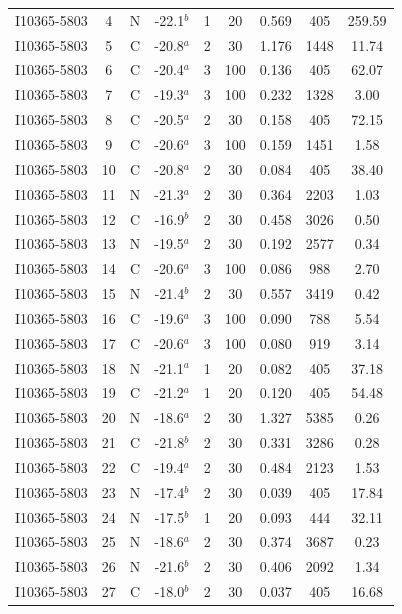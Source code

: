 \begin{table}
\begin{tabular}{ccccccccc}
I10365-5803 & 4 & N & -22.1$^{b}$ & 1 & 20 & 0.569 & 405 & 259.59 \\
I10365-5803 & 5 & C & -20.8$^{a}$ & 2 & 30 & 1.176 & 1448 & 11.74 \\
I10365-5803 & 6 & C & -20.4$^{a}$ & 3 & 100 & 0.136 & 405 & 62.07 \\
I10365-5803 & 7 & C & -19.3$^{a}$ & 3 & 100 & 0.232 & 1328 & 3.00 \\
I10365-5803 & 8 & C & -20.5$^{a}$ & 2 & 30 & 0.158 & 405 & 72.15 \\
I10365-5803 & 9 & C & -20.6$^{a}$ & 3 & 100 & 0.159 & 1451 & 1.58 \\
I10365-5803 & 10 & C & -20.8$^{a}$ & 2 & 30 & 0.084 & 405 & 38.40 \\
I10365-5803 & 11 & N & -21.3$^{a}$ & 2 & 30 & 0.364 & 2203 & 1.03 \\
I10365-5803 & 12 & C & -16.9$^{b}$ & 2 & 30 & 0.458 & 3026 & 0.50 \\
I10365-5803 & 13 & N & -19.5$^{a}$ & 2 & 30 & 0.192 & 2577 & 0.34 \\
I10365-5803 & 14 & C & -20.6$^{a}$ & 3 & 100 & 0.086 & 988 & 2.70 \\
I10365-5803 & 15 & N & -21.4$^{b}$ & 2 & 30 & 0.557 & 3419 & 0.42 \\
I10365-5803 & 16 & C & -19.6$^{a}$ & 3 & 100 & 0.090 & 788 & 5.54 \\
I10365-5803 & 17 & C & -20.6$^{a}$ & 3 & 100 & 0.080 & 919 & 3.14 \\
I10365-5803 & 18 & N & -21.1$^{a}$ & 1 & 20 & 0.082 & 405 & 37.18 \\
I10365-5803 & 19 & C & -21.2$^{a}$ & 1 & 20 & 0.120 & 405 & 54.48 \\
I10365-5803 & 20 & N & -18.6$^{a}$ & 2 & 30 & 1.327 & 5385 & 0.26 \\
I10365-5803 & 21 & C & -21.8$^{b}$ & 2 & 30 & 0.331 & 3286 & 0.28 \\
I10365-5803 & 22 & C & -19.4$^{a}$ & 2 & 30 & 0.484 & 2123 & 1.53 \\
I10365-5803 & 23 & N & -17.4$^{b}$ & 2 & 30 & 0.039 & 405 & 17.84 \\
I10365-5803 & 24 & N & -17.5$^{b}$ & 1 & 20 & 0.093 & 444 & 32.11 \\
I10365-5803 & 25 & N & -18.6$^{a}$ & 2 & 30 & 0.374 & 3687 & 0.23 \\
I10365-5803 & 26 & N & -21.6$^{b}$ & 2 & 30 & 0.406 & 2092 & 1.34 \\
I10365-5803 & 27 & C & -18.0$^{b}$ & 2 & 30 & 0.037 & 405 & 16.68 \\

\end{tabular}
\end{table}
